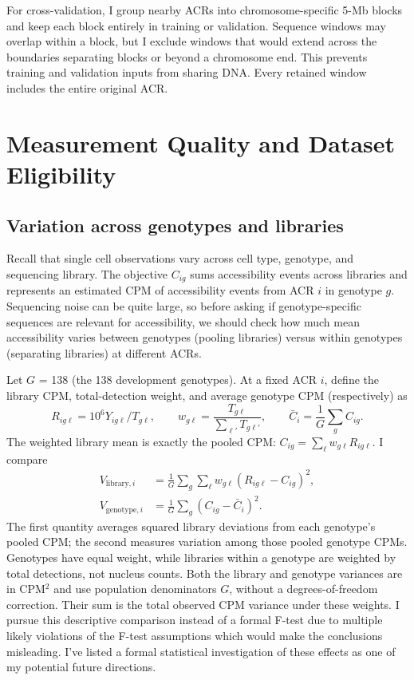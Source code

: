 \documentclass[10pt]{article}
\begin{document}
For cross-validation, I group nearby ACRs into chromosome-specific 5-Mb blocks and keep each block entirely in training or validation. Sequence windows may overlap within a block, but I exclude windows that would extend across the boundaries separating blocks or beyond a chromosome end. This prevents training and validation inputs from sharing DNA. Every retained window includes the entire original ACR. 

\section{Measurement Quality and Dataset Eligibility}

\subsection{Variation across genotypes and libraries}
Recall that single cell observations vary across cell type, genotype, and sequencing library. The objective $C_{ig}$ sums accessibility events across libraries and represents an estimated CPM of accessibility events from ACR $i$ in genotype $g$. Sequencing noise can be quite large, so before asking if genotype-specific sequences are relevant for accessibility, we should check how much mean accessibility varies between genotypes (pooling libraries) versus within genotypes (separating libraries) at different ACRs.

Let $G$ = 138 (the 138 development genotypes). At a fixed ACR $i$, define the library CPM, total-detection weight, and average genotype CPM (respectively) as
\[
R_{ig\ell}=10^6Y_{ig\ell}/T_{g\ell},\qquad
w_{g\ell}=\frac{T_{g\ell}}{\sum_{\ell'}T_{g\ell'}},\qquad
\bar C_i=\frac{1}{G}\sum_g C_{ig}.
\]
The weighted library mean is exactly the pooled CPM: $C_{ig}=\sum_\ell w_{g\ell}R_{ig\ell}$. I compare
\begin{align}
V_{\mathrm{library},i}&=\frac{1}{G}\sum_g\sum_\ell w_{g\ell}(R_{ig\ell}-C_{ig})^2,\label{eq:libraryvar}\\
V_{\mathrm{genotype},i}&=\frac{1}{G}\sum_g(C_{ig}-\bar C_i)^2.\label{eq:genotypevar}
\end{align}
The first quantity averages squared library deviations from each genotype's pooled CPM; the second measures variation among those pooled genotype CPMs. Genotypes have equal weight, while libraries within a genotype are weighted by total detections, not nucleus counts. Both the library and genotype variances are in CPM$^2$ and use population denominators $G$, without a degrees-of-freedom correction. Their sum is the total observed CPM variance under these weights. I pursue this  descriptive comparison instead of a formal F-test due to multiple likely violations of the F-test assumptions which would make the conclusions misleading. I've listed a formal statistical investigation of these effects as one of my potential future directions. 
\end{document}
